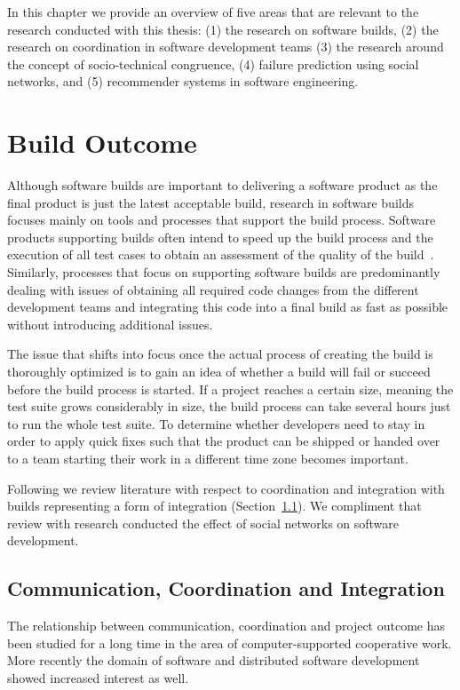 \label{chap:bg}
In this chapter we provide an overview of five areas that are relevant to the research conducted with this thesis: (1) the research on software builds, (2) the research on coordination in software development teams (3) the research around the concept of socio-technical congruence, (4) failure prediction using social networks, and (5) recommender systems in software engineering.

\section{Build Outcome}
Although software builds are important to delivering a software product as the final product is just the latest acceptable build, research in software builds focuses mainly on tools and processes that support the build process.
Software products supporting builds often intend to speed up the build process and the execution of all test cases to obtain an assessment of the quality of the build~\cite{maraia:book:2005}.
Similarly, processes that focus on supporting software builds are predominantly dealing with issues of obtaining all required code changes from the different development teams and integrating this code into a final build as fast as possible without introducing additional issues.

The issue that shifts into focus once the actual process of creating the build is thoroughly optimized is to gain an idea of whether a build will fail or succeed before the build process is started.
If a project reaches a certain size, meaning the test suite grows considerably in size, the build process can take several hours just to run the whole test suite.
To determine whether developers need to stay in order to apply quick fixes such that the product can be shipped or handed over to a team starting their work in a different time zone becomes important.

Following we review literature with respect to coordination and integration with builds representing a form of integration (Section~\ref{sec:RelatedCommunication}).
We compliment that review with research conducted the effect of social networks on software development.

\subsection{Communication, Coordination and Integration}
\label{sec:RelatedCommunication}
The relationship between communication, coordination and project outcome has been
studied for a long time in the area of computer-supported cooperative work. More
recently the domain of software and distributed software development showed
increased interest as well.

